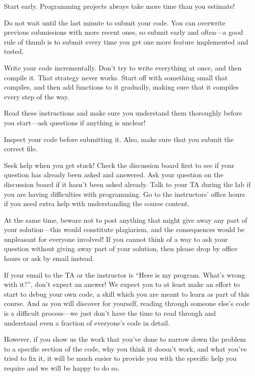 \documentclass[11pt]{article}
\let\ezimeti\itemize
\let\ezimetidne\enditemize
\renewenvironment{itemize}
   {\ezimeti
    \setlength{\topsep}{.25ex plus .125ex minus .1825ex}%
    \setlength{\itemsep}{\topsep}\setlength{\parsep}{0ex}%
    \setlength{\leftmargin}{1.75em}\setlength{\labelsep}{.5em}%
    \setlength{\labelwidth}{1.75em}\ignorespaces}
   {\ezimetidne}
\begin{document}
\begin{itemize}
\item
    Start early.  Programming projects always take more time than you 
    estimate!
\item
    Do not wait until the last minute to submit your code.  You can 
    overwrite previous submissions with more recent ones, so submit early 
    and often---a good rule of thumb is to submit every time you get one 
    more feature implemented and tested.
\item
    Write your code incrementally.  Don't try to write everything at once, 
    and then compile it.  That strategy never works.  Start off with 
    something small that compiles, and then add functions to it gradually, 
    making sure that it compiles every step of the way.
\item
    Read these instructions and make sure you understand them thoroughly 
    before you start---ask questions if anything is unclear!
\item
    Inspect your code before submitting it.  Also, make sure that you 
    submit the correct file.
\item
    Seek help when you get stuck!  Check the discussion board first to see 
    if your question has already been asked and answered.  Ask your 
    question on the discussion board if it hasn't been asked already.  Talk 
    to your TA during the lab if you are having difficulties with 
    programming.  Go to the instructors' office hours if you need extra 
    help with understanding the course content.

    At the same time, beware not to post anything that might give away any 
    part of your solution---this would constitute plagiarism, and the 
    consequences would be unpleasant for everyone involved!  If you cannot 
    think of a way to ask your question without giving away part of your 
    solution, then please drop by office hours or ask by email instead.
\item
    If your email to the TA or the instructor is ``Here is my program.  
    What's wrong with it?'', don't expect an answer!  We expect you to at 
    least make an effort to start to debug your own code, a skill which you 
    are meant to learn as part of this course.  And as you will discover 
    for yourself, reading through someone else's code is a difficult 
    process---we just don't have the time to read through and understand 
    even a fraction of everyone's code in detail.

    However, if you show us the work that you've done to narrow down the 
    problem to a specific section of the code, why you think it doesn't 
    work, and what you've tried to fix it, it will be much easier to 
    provide you with the specific help you require and we will be happy to 
    do so.
\end{itemize}
\end{document}
